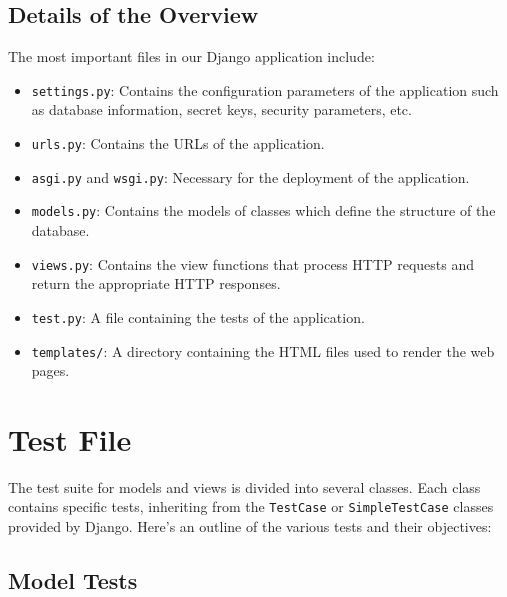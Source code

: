 \documentclass[12pt]{article}
\begin{document}
\newpage{}
\subsection{Details of the Overview}
The most important files in our Django application include:

\begin{itemize}
    \item \texttt{settings.py}: Contains the configuration parameters of the application such as database information, secret keys, security parameters, etc.
    \item \texttt{urls.py}: Contains the URLs of the application.
    \item \texttt{asgi.py} and \texttt{wsgi.py}: Necessary for the deployment of the application.
    \item \texttt{models.py}: Contains the models of classes which define the structure of the database.
    \item \texttt{views.py}: Contains the view functions that process HTTP requests and return the appropriate HTTP responses.
    \item \texttt{test.py}: A file containing the tests of the application.
    \item \texttt{templates/}: A directory containing the HTML files used to render the web pages.
\end{itemize}

\section{Test File}

The test suite for models and views is divided into several classes. Each class contains specific tests, inheriting from the \texttt{TestCase} or \texttt{SimpleTestCase} classes provided by Django. Here's an outline of the various tests and their objectives:

\subsection{Model Tests}
\end{document}
